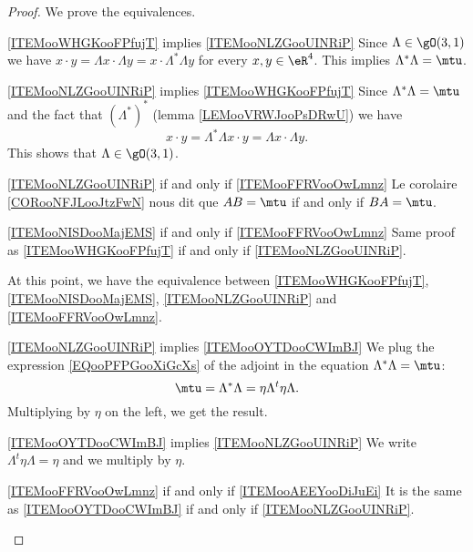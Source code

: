 \begin{proof}
    We prove the equivalences.
    \begin{subproof}
        \item[\ref{ITEMooWHGKooFPfujT} implies \ref{ITEMooNLZGooUINRiP}]
            Since \( \Lambda\in \gO(3,1)\) we have $x\cdot y=\Lambda x\cdot \Lambda y=x\cdot \Lambda^*\Lambda y$ for every \( x,y\in \eR^4\). This implies \( \Lambda^*\Lambda=\mtu\).
        \item[\ref{ITEMooNLZGooUINRiP} implies \ref{ITEMooWHGKooFPfujT}]
            Since \( \Lambda^*\Lambda=\mtu\) and the fact that \( (\Lambda^*)^*\) (lemma \ref{LEMooVRWJooPsDRwU}) we have
            \begin{equation}
                x\cdot y=\Lambda^*\Lambda x\cdot y=\Lambda x\cdot \Lambda y.
            \end{equation}
            This shows that \( \Lambda\in \gO(3,1)\).
        \item[\ref{ITEMooNLZGooUINRiP} if and only if \ref{ITEMooFFRVooOwLmnz}]
            Le corolaire \ref{CORooNFJLooJtzFwN} nous dit que \( AB=\mtu\) if and only if \( BA=\mtu\).
        \item[\ref{ITEMooNISDooMajEMS} if and only if \ref{ITEMooFFRVooOwLmnz}]
            Same proof as \ref{ITEMooWHGKooFPfujT} if and only if \ref{ITEMooNLZGooUINRiP}.
    \end{subproof}
    At this point, we have the equivalence between \ref{ITEMooWHGKooFPfujT}, \ref{ITEMooNISDooMajEMS}, \ref{ITEMooNLZGooUINRiP} and \ref{ITEMooFFRVooOwLmnz}.
    \begin{subproof}
        \item[\ref{ITEMooNLZGooUINRiP} implies \ref{ITEMooOYTDooCWImBJ}]
            We plug the expression \eqref{EQooPFPGooXiGcXs} of the adjoint in the equation \( \Lambda^*\Lambda=\mtu\):
            \begin{equation}
                \mtu=\Lambda^*\Lambda=\eta\Lambda^t\eta\Lambda.
            \end{equation}
            Multiplying by \( \eta\) on the left, we get the result.
        \item[\ref{ITEMooOYTDooCWImBJ} implies \ref{ITEMooNLZGooUINRiP}]
            We write \( \Lambda^t\eta\Lambda=\eta\) and we multiply by \( \eta\).
        \item[\ref{ITEMooFFRVooOwLmnz} if and only if \ref{ITEMooAEEYooDiJuEi}]
            It is the same as \ref{ITEMooOYTDooCWImBJ} if and only if \ref{ITEMooNLZGooUINRiP}.
    \end{subproof}
\end{proof}

